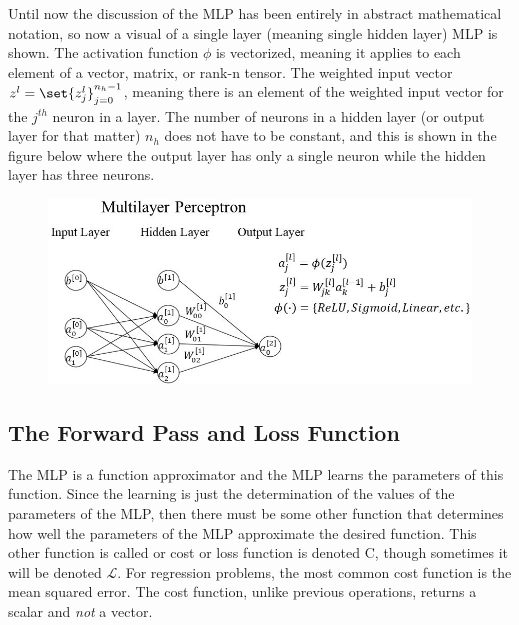 \documentclass{article}
\DeclarePairedDelimiter\set\{\}
\begin{document}
Until now the discussion of the MLP has been entirely in abstract mathematical
notation, so now a visual of a single layer (meaning single hidden layer)
MLP is shown. The activation function $\phi$ is vectorized, meaning it
applies to each element of a vector, matrix, or rank-n tensor. The weighted input
vector $z^{l} = \set{ z_{j}^{l} }_{j=0}^{n_{h} - 1}$, meaning there is an element
of the weighted input vector for the $j^{th}$ neuron in a layer. The number of
neurons in a hidden layer (or output layer for that matter) $n_h$ does not have
to be constant, and this is shown in the figure below where the output layer
has only a single neuron while the hidden layer has three neurons.

\begin{figure}[h]
	\includegraphics[scale=0.60]{mlp_larger_font_croppped.jpg}
\end{figure}


\subsection{The Forward Pass and Loss Function}
\quad The MLP is a function approximator and the MLP learns the parameters of
this function. Since the learning is just the determination of the values of the
parameters of the MLP, then there must be some other function that determines
how well the parameters of the MLP approximate the desired function. This other
function is called or cost or loss function is denoted C, though sometimes
it will be denoted $\mathcal{L}$. For regression problems, the most common
cost function is the mean squared error. The cost function, unlike previous
operations, returns a scalar and \textit{not} a vector.
\end{document}
